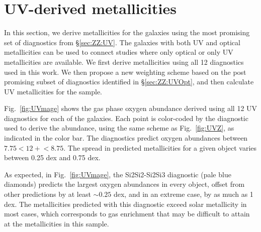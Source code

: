 

\section{UV-derived metallicities}\label{sec:UVZ}

In this section, we derive metallicities for the \mage galaxies using the most promising set of diagnostics from \S\ref{sec:ZZ:UV}. The \mage galaxies with both UV and optical metallicities can be used to connect studies where only optical or only UV metallicities are available. We first derive metallicities using all 12 diagnostics used in this work. We then propose a new weighting scheme based on the post promising subset of diagnostics identified in \S\ref{sec:ZZ:UVOpt}, and then calculate UV metallicities for the \mage sample.

Fig.~\ref{fig:UVmage} shows the gas phase oxygen abundance derived using all 12 UV diagnostics for each of the \mage galaxies. Each point is color-coded by the diagnostic used to derive the abundance, using the same scheme as Fig.~\ref{fig:UVZ}, as indicated in the color bar. The diagnostics predict oxygen abundances between $7.75< 12+$\logOH$<8.75$. The spread in predicted metallicities for a given object varies between 0.25 dex and 0.75 dex.

As expected, in Fig.~\ref{fig:UVmage}, the Si2Si2-Si2Si3 diagnostic (pale blue diamonds) predicts the largest oxygen abundances in every object, offset from other predictions by at least $\sim0.25$ dex, and in an extreme case, by as much as 1\,dex. The metallicities predicted with this diagnostic exceed solar metallicity in most cases, which corresponds to gas enrichment that may be difficult to attain at the metallicities in this sample.

